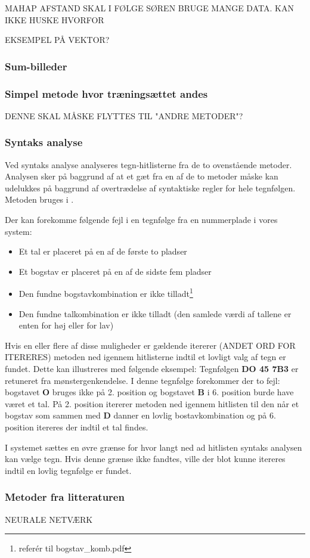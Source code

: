 MAHAP AFSTAND SKAL I FØLGE SØREN BRUGE MANGE DATA. KAN IKKE HUSKE HVORFOR

EKSEMPEL PÅ VEKTOR?

\subsubsection{Sum-billeder}

\subsubsection{Simpel metode hvor træningsættet andes}

DENNE SKAL MÅSKE FLYTTES TIL "ANDRE METODER"?

\subsubsection{Syntaks analyse}

Ved syntaks analyse analyseres tegn-hitlisterne fra de to ovenstående metoder. Analysen sker på baggrund af at et gæt fra en af de to metoder måske kan udelukkes på baggrund af overtrædelse af syntaktiske regler for hele tegnfølgen. Metoden bruges i \cite{nijhuis}.

Der kan forekomme følgende fejl i en tegnfølge fra en nummerplade i vores system:

\begin{itemize}
\item Et tal er placeret på en af de første to pladser
\item Et bogstav er placeret på en af de sidste fem pladser
\item Den fundne bogstavkombination er ikke tilladt\footnote{referér til bogstav\_komb.pdf}
\item Den fundne talkombination er ikke tilladt (den samlede værdi af tallene er enten for høj eller for lav)
\end{itemize}

Hvis en eller flere af disse muligheder er gældende itererer (ANDET ORD FOR ITERERES) metoden ned igennem hitlisterne indtil et lovligt valg af tegn er fundet. Dette kan illustreres med følgende eksempel: Tegnfølgen \textbf{DO 45 7B3} er retuneret fra mønstergenkendelse. I denne tegnfølge forekommer der to fejl: bogstavet \textbf{O} bruges ikke på 2. position og bogstavet \textbf{B} i 6. position burde have været et tal. På 2. position itererer metoden ned igennem hitlisten til den når et bogstav som sammen med \textbf{D} danner en lovlig bostavkombination og på 6. position itereres der indtil et tal findes.

I systemet sættes en øvre grænse for hvor langt ned ad hitlisten syntaks analysen kan vælge tegn. Hvis denne grænse ikke fandtes, ville der blot kunne itereres indtil en lovlig tegnfølge er fundet.

\subsubsection{Metoder fra litteraturen}

NEURALE NETVÆRK
